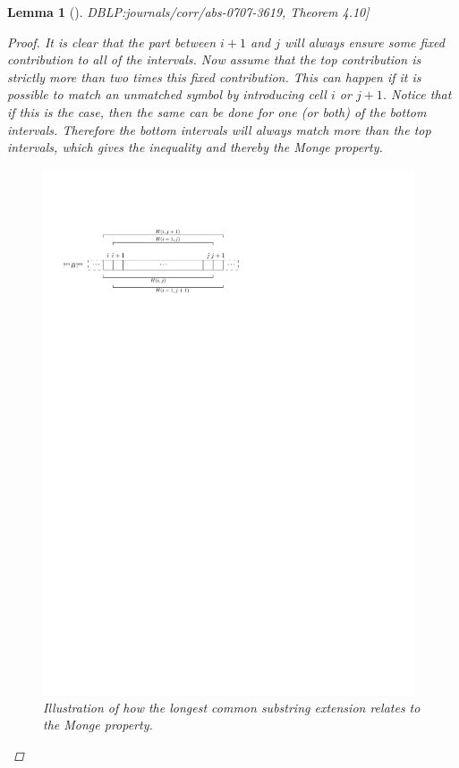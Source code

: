 \documentclass[twoside,11pt,openright]{report}
\newcommand{\refbook}[2]{\cite[#1]{DBLP:journals/corr/abs-0707-3619}, #2}
\newtheorem{lemma}{Lemma}
\begin{document}
\begin{lemma}[\refbook{p.-49}{Theorem 4.10}]
\begin{proof}
    It is clear that the part between $i + 1$ and $j$ will always ensure some fixed contribution to all of the intervals. Now assume that the top contribution is strictly more than two times this fixed contribution. This can happen if it is possible to match an unmatched symbol by introducing cell $i$ or $j + 1$. Notice that if this is the case, then the same can be done for one (or both) of the bottom intervals. Therefore the bottom intervals will always match more than the top intervals, which gives the inequality and thereby the Monge property.
    \begin{figure}[h!]
      \centering
      \includegraphics[width=11cm]{images/monge-condition-illustration}
      \caption{Illustration of how the longest common substring extension relates to the Monge property.}
      \label{fig:H-permutation-representation:monge}
    \end{figure}


\end{proof}
\end{lemma}
\end{document}
